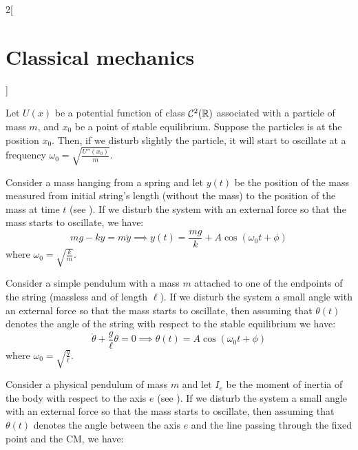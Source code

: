 \documentclass[../../../main_physics.tex]{subfiles}
\begin{document}
\begin{multicols}{2}[\section{Classical mechanics}]
\begin{definition}
  \end{definition}
  \begin{proposition}
    Let $U(x)$ be a potential function of class $\mathcal{C}^2(\mathbb{R})$ associated with a particle of mass $m$, and $x_0$ be a point of stable equilibrium. Suppose the particles is at the position $x_0$. Then, if we disturb slightly the particle, it will start to oscillate at a frequency $\omega_0=\sqrt{\frac{U''(x_0)}{m}}$.
  \end{proposition}
  \begin{proposition}
    Consider a mass hanging from a spring and let $y(t)$ be the position of the mass measured from initial string's length (without the mass) to the position of the mass at time $t$ (see ). If we disturb the system with an external force so that the mass starts to oscillate, we have: $$mg-ky=m\ddot{y}\implies y(t)=\frac{mg}{k}+A\cos(\omega_0t+\phi)$$ where $\omega_0=\sqrt{\frac{k}{m}}$.
    \begin{center}
      \begin{minipage}{\linewidth}
        \centering
        
        \label{CM_fig2}
      \end{minipage}
    \end{center}
  \end{proposition}
  \begin{proposition}
    Consider a simple pendulum with a mass $m$ attached to one of the endpoints of the string (massless and of length $\ell$). If we disturb the system a small angle with an external force so that the mass starts to oscillate, then assuming that $\theta(t)$ denotes the angle of the string with respect to the stable equilibrium we have:
    $$\ddot{\theta}+\frac{g}{\ell}\theta=0\implies\theta(t)=A\cos(\omega_0t+\phi)$$ where $\omega_0=\sqrt{\frac{g}{\ell}}$.
    \begin{center}
      \begin{minipage}{\linewidth}
        \centering
        
      \end{minipage}
    \end{center}
  \end{proposition}
  \begin{proposition}
    Consider a physical pendulum of mass $m$ and let $I_e$ be the moment of inertia of the body with respect to the axis $e$ (see ). If we disturb the system a small angle with an external force so that the mass starts to oscillate, then assuming that $\theta(t)$ denotes the angle between the axis $e$ and the line passing through the fixed point and the CM, we have:

\end{proposition}
\end{multicols}
\end{document}
